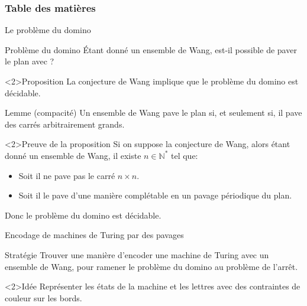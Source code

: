 \documentclass{beamer}
\newcommand{\N}{\mathbb N}
\begin{document}
    \begin{frame}
        \frametitle{Table des matières}
        \tableofcontents[currentsection]
    \end{frame}
    
    \begin{frame}{Le problème du domino}
    
    \begin{alertblock}{Problème du domino}
        Étant donné un ensemble de Wang, est-il possible de paver le plan avec ?
    \end{alertblock}
    
    \begin{block}<2>{Proposition}
        La conjecture de Wang implique que le problème du domino est décidable.
    \end{block}
    
    \end{frame}
    
    \begin{frame}
    
    \begin{block}{Lemme (compacité)}
        Un ensemble de Wang pave le plan si, et seulement si, il pave des carrés arbitrairement grands.
    \end{block}
    
    \begin{exampleblock}<2>{Preuve de la proposition}
        Si on suppose la conjecture de Wang, alors étant donné un ensemble de Wang, il existe $n\in\N^*$ tel que:
        \begin{itemize}
            \item Soit il ne pave pas le carré $n\times n$.
            \item Soit il le pave d'une manière complétable en un pavage périodique du plan. 
        \end{itemize}
        Donc le problème du domino est décidable.
    \end{exampleblock}
    
    \end{frame}
    
    \begin{frame}{Encodage de machines de Turing par des pavages}
    
    \begin{alertblock}{Stratégie}
        Trouver une manière d'encoder une machine de Turing avec un ensemble de Wang, pour ramener le problème du domino au problème de l'arrêt.
    \end{alertblock}
    
    \begin{block}<2>{Idée}
        Représenter les états de la machine et les lettres avec des contraintes de couleur sur les bords.
    \end{block}
    
    \end{frame}
    
\end{document}
